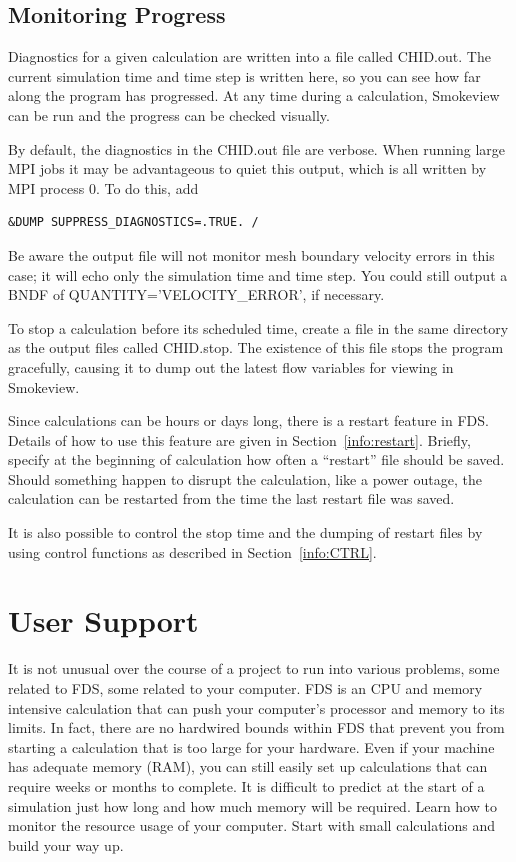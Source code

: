 \documentclass[11pt]{book}
\begin{document}
\section{Monitoring Progress}
\label{info:monitoring_progress}

Diagnostics for a given calculation are written into a file called {\ct CHID.out}. The current simulation time and time step is written here, so you can see how far along the program has progressed. At any time during a calculation, Smokeview can be run and the progress can be checked visually.

By default, the diagnostics in the {\ct CHID.out} file are verbose.  When running large MPI jobs it may be advantageous to quiet this output, which is all written by MPI process 0.  To do this, add
\begin{lstlisting}
&DUMP SUPPRESS_DIAGNOSTICS=.TRUE. /
\end{lstlisting}
Be aware the output file will not monitor mesh boundary velocity errors in this case; it will echo only the simulation time and time step.  You could still output a {\ct BNDF} of {\ct QUANTITY='VELOCITY\_ERROR'}, if necessary.

To stop a calculation before its scheduled time, create a file in the same directory as the output files called {\ct CHID.stop}. The existence of this file stops the program gracefully, causing it to dump out the latest flow variables for viewing in Smokeview.

Since calculations can be hours or days long, there is a restart feature in FDS. Details of how to use this feature are given in Section~\ref{info:restart}. Briefly, specify at the beginning of calculation how often a ``restart'' file should be saved. Should something happen to disrupt the calculation, like a power outage, the calculation can be restarted from the time the last restart file was saved.

It is also possible to control the stop time and the dumping of restart files by using control functions as described in Section~\ref{info:CTRL}.




\chapter{User Support}

It is not unusual over the course of a project to run into various problems, some related to FDS, some related to your computer. FDS is an CPU and memory intensive calculation that can push your computer's processor and memory to its limits. In fact, there are no hardwired bounds within FDS that prevent you from starting a calculation that is too large for your hardware. Even if your machine has adequate memory (RAM), you can still easily set up calculations that can require weeks or months to complete. It is difficult to predict at the start of a simulation just how long and how much memory will be required. Learn how to monitor the resource usage of your computer. Start with small calculations and build your way up.
\end{document}
